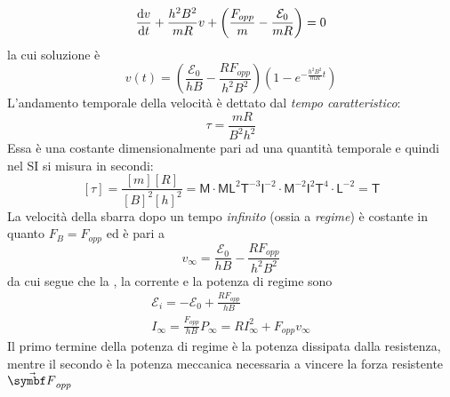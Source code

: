 \begin{equation*}
	\dv{v}{t}+\frac{h^2B^2}{mR}v+\left(\frac{F_{opp}}{m}-\frac{\mathcal{E}_0}{mR}\right)=0
\end{equation*}
la cui soluzione è
\begin{equation}
	v(t)=\left(\frac{\mathcal{E}_0}{hB}-\frac{R F_{opp}}{h^2B^2}\right)\left(1-e^{-\frac{h^2B^2}{mR}t}\right)
\end{equation}
L'andamento temporale della velocità è dettato dal \textit{tempo caratteristico}:
\begin{equation}
	\tau=\frac{mR}{B^2h^2}
\end{equation}
Essa è una costante dimensionalmente pari ad una quantità temporale e quindi nel SI si misura in secondi:
\begin{equation*}
	\left[\tau\right]=\frac{\left[m\right]\left[R\right]}{\left[B\right]^2\left[h\right]^2}=\mathsf{M}\cdot\mathsf{M}\mathsf{L}^2\mathsf{T}^{-3} \mathsf{I}^{-2}\cdot \mathsf{M}^{-2} \mathsf{I}^{2} \mathsf{T}^4\cdot\mathsf{L}^{-2}  =\mathsf{T}
\end{equation*}
La velocità della sbarra dopo un tempo \textit{infinito} (ossia a \textit{regime}) è costante in quanto $F_B=F_{opp}$ ed è pari a
\begin{equation}
	v_{\infty}=\frac{\mathcal{E}_0}{hB}-\frac{R F_{opp}}{h^2B^2}
\end{equation}
da cui segue che la \fem, la corrente e la potenza di regime sono
\begin{gather}
	\mathcal{E}_i=-\mathcal{E}_0+\frac{R F_{opp}}{hB}\\
	I_{\infty}=\frac{F_{opp}}{hB}
	P_{\infty}=RI_{\infty}^2+F_{opp}v_{\infty}
\end{gather}
Il primo termine della potenza di regime è la potenza dissipata dalla resistenza, mentre il secondo è la potenza meccanica necessaria a vincere la forza resistente $\vba{F}_{opp}$
